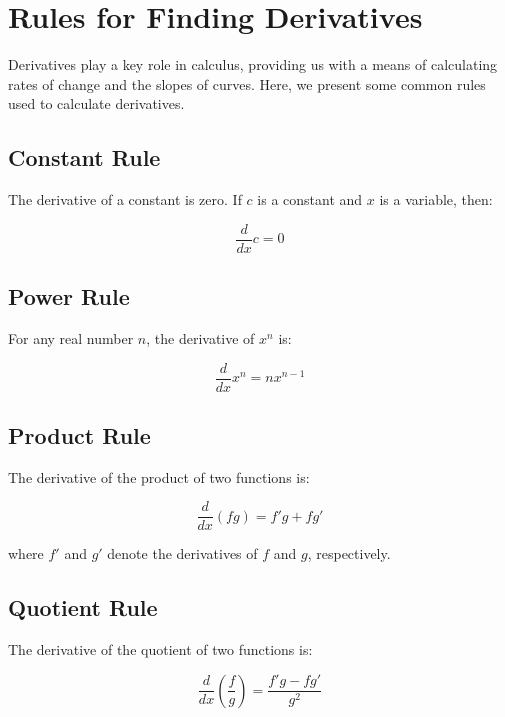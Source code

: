 \chapter{Rules for Finding Derivatives}


Derivatives play a key role in calculus, providing us with a means of calculating rates of change and the slopes of curves. Here, we present some common rules used to calculate derivatives.

\section{Constant Rule}

The derivative of a constant is zero. If $c$ is a constant and $x$ is a variable, then:

\begin{equation}
\frac{d}{dx}c = 0
\end{equation}

\section{Power Rule}

For any real number $n$, the derivative of $x^n$ is:

\begin{equation}
\frac{d}{dx}x^n = nx^{n-1}
\end{equation}

\section{Product Rule}

The derivative of the product of two functions is:

\begin{equation}
\frac{d}{dx}(fg) = f'g + fg'
\end{equation}

where $f'$ and $g'$ denote the derivatives of $f$ and $g$, respectively.

\section{Quotient Rule}

The derivative of the quotient of two functions is:

\begin{equation}
\frac{d}{dx}\left(\frac{f}{g}\right) = \frac{f'g - fg'}{g^2}
\end{equation}

